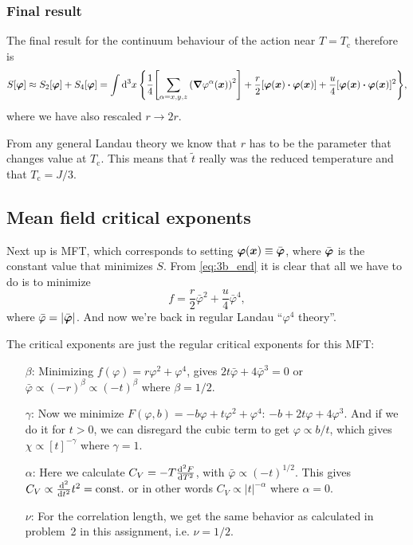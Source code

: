 \documentclass[11pt,letter, swedish, english
]{article}
\newcommand{\Tc}{\ensuremath{T_{\text{c}}}}
\begin{document}
\subsubsection{Final result}
The final result for the continuum behaviour of the action near
$T=\Tc$ therefore is
\begin{equation}\label{eq:3b_end}
S[\vb*\varphi]\approx S_2[\vb*\varphi]+S_4[\vb*\varphi]=
\int\rd^3x\,\qty{
\frac{1}{4}\qty[\sum_{\alpha=x,y,z}\qty(\grad\varphi^\alpha(\vb*x))^2]
+\frac{r}{2}[\vb*\varphi(\vb*x)\vdot\vb*\varphi(\vb*x)]
+\frac{u}{4}[\vb*\varphi(\vb*x)\vdot\vb*\varphi(\vb*x)]^2},
\end{equation}
where we have also rescaled $r\to2r$.

From any general Landau theory we know that $r$ has to be the
parameter that changes value at $\Tc$. This means that $\tilde{t}$
really was the reduced temperature and that $\Tc=J/3$.



\subsection{Mean field critical exponents}
Next up is MFT, which corresponds to setting
$\vb*\varphi(\vb*x)\equiv\bar{\vb*\varphi}$, where
$\bar{\vb*\varphi}$ is the constant value that minimizes $S$. From
\eqref{eq:3b_end} it is clear that all we have to do is to minimize
\begin{equation}
f=\frac{r}{2}\bar\varphi^2+\frac{u}{4}\bar\varphi^4,
\end{equation}
where $\bar\varphi=|\bar{\vb*\varphi}|$. And now we're back in regular
Landau ``$\varphi^4$ theory''. 

The critical exponents are just the regular critical exponents for
this MFT:
\begin{itemize}
\item[$\beta$: ] Minimizing $f(\varphi)=r\varphi^2+\varphi^4$,
gives $2t\bar\varphi+4\bar\varphi^3=0$ or 
$\bar\varphi\propto(-r)^{\beta}\propto(-t)^{\beta}$ where $\beta=1/2$.
\item[$\gamma$: ] Now we minimize $F(\varphi,
b)=-b\varphi+t\varphi^2+\varphi^4$: $-b+2t\varphi+4\varphi^3$. And if
we do it for $t>0$, we can disregard the cubic term to get
$\varphi\propto b/t$, which gives $\chi\propto[t]^{-\gamma}$ where
$\gamma=1$.
\item[$\alpha$: ] Here we calculate $C_V=-T\dv[2]{F}{T}$, with
$\bar\varphi\propto(-t)^{1/2}$. This gives
$C_V\propto\dv[2]{t}t^2=\text{const.}$ or in other words
$C_V\propto|t|^{-\alpha}$ where $\alpha=0$.
\item[$\nu$: ] For the correlation length, we get the same behavior as
calculated in problem~2 in this assignment, i.e. $\nu=1/2$.
\end{itemize}
\end{document}
